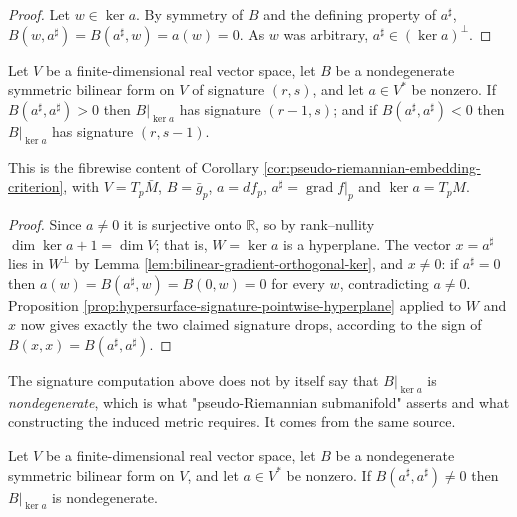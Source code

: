 \begin{proof}
\leanok
{}
Let $w \in \ker a$. By symmetry of $B$ and the defining property of $a^\sharp$, $B(w, a^\sharp) = B(a^\sharp, w) = a(w) = 0$. As $w$ was arbitrary, $a^\sharp \in (\ker a)^\perp$.
\end{proof}

\begin{proposition}
\label{prop:embedding-criterion-pointwise}
\leanok
{}
Let $V$ be a finite-dimensional real vector space, let $B$ be a nondegenerate symmetric bilinear form on $V$ of signature $(r,s)$, and let $a \in V^*$ be nonzero. If $B(a^\sharp, a^\sharp) > 0$ then $B|_{\ker a}$ has signature $(r-1, s)$; and if $B(a^\sharp, a^\sharp) < 0$ then $B|_{\ker a}$ has signature $(r, s-1)$.

This is the fibrewise content of Corollary \ref{cor:pseudo-riemannian-embedding-criterion}, with $V = T_p \bar{M}$, $B = \bar{g}_p$, $a = df_p$, $a^\sharp = \operatorname{grad} f|_p$ and $\ker a = T_p M$.
\end{proposition}

\begin{proof}
\leanok
{}
Since $a \neq 0$ it is surjective onto $\mathbb{R}$, so by rank--nullity $\dim \ker a + 1 = \dim V$; that is, $W = \ker a$ is a hyperplane. The vector $x = a^\sharp$ lies in $W^\perp$ by Lemma \ref{lem:bilinear-gradient-orthogonal-ker}, and $x \neq 0$: if $a^\sharp = 0$ then $a(w) = B(a^\sharp, w) = B(0,w) = 0$ for every $w$, contradicting $a \neq 0$. Proposition \ref{prop:hypersurface-signature-pointwise-hyperplane} applied to $W$ and $x$ now gives exactly the two claimed signature drops, according to the sign of $B(x,x) = B(a^\sharp, a^\sharp)$.
\end{proof}

The signature computation above does not by itself say that $B|_{\ker a}$ is \emph{nondegenerate}, which is what "pseudo-Riemannian submanifold" asserts and what constructing the induced metric requires. It comes from the same source.

\begin{lemma}
\label{lem:embedding-criterion-nondegenerate-pointwise}
\leanok
{}
Let $V$ be a finite-dimensional real vector space, let $B$ be a nondegenerate symmetric bilinear form on $V$, and let $a \in V^*$ be nonzero. If $B(a^\sharp, a^\sharp) \neq 0$ then $B|_{\ker a}$ is nondegenerate.
\end{lemma}

